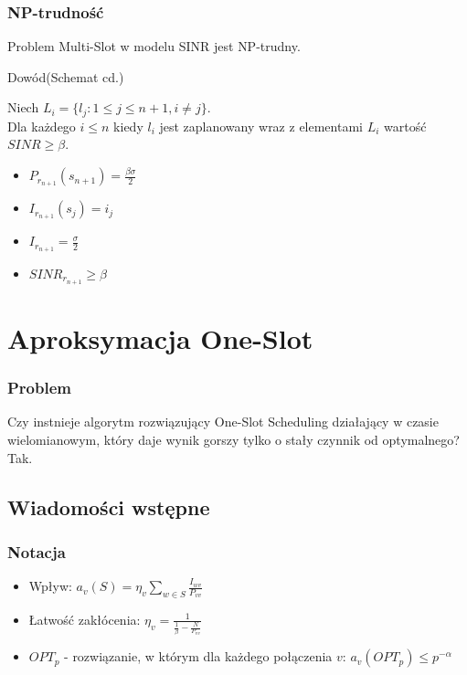 \documentclass[polish, t,10pt]{beamer}
\begin{document}
\begin{frame}
    \frametitle{NP-trudność}
    \begin{theorem}
        Problem Multi-Slot w modelu SINR jest NP-trudny.
    \end{theorem}
    \begin{block}{Dowód(Schemat cd.)}
        \begin{lemma}
            Niech $L_i = \{l_j: 1 \leq j \leq n + 1, i \neq j\}$.\\
            Dla każdego $i \leq n$ kiedy $l_i$ jest zaplanowany wraz z elementami $L_i$ wartość $SINR \ge \beta$.
        \end{lemma}
        \begin{itemize}
            \item $P_{r_{n+1}}(s_{n+1}) = \frac{\beta\sigma}{2}$
            \item $I_{r_{n+1}}(s_j) = i_j$
            \item $I_{r_{n+1}} = \frac{\sigma}{2}$
            \item $SINR_{r_{n+1}} \geq \beta$
        \end{itemize}
    \end{block}
\end{frame}

\section{Aproksymacja One-Slot}
\begin{frame}
    \frametitle{Problem}
        Czy instnieje algorytm rozwiązujący One-Slot Scheduling działający w czasie wielomianowym,
        który daje wynik gorszy tylko o stały czynnik od optymalnego?
        \pause
        \vfill
        Tak.
\end{frame}

\subsection{Wiadomości wstępne}
\begin{frame}
    \frametitle{Notacja}
    \begin{itemize}
        \item Wpływ: $a_v(S) = \eta_v \sum_{w \in S} \frac{I_{wv}}{P_{vv}}$
        \item Łatwość zakłócenia: $\eta_v = \frac{1}{\frac{1}{\beta} - \frac{N}{P_{vv}}}$
        \item $OPT_p$ - rozwiązanie, w którym dla każdego połączenia $v$: $a_v(OPT_p) \le p^{-\alpha}$
    \end{itemize}
\end{frame}
\end{document}
